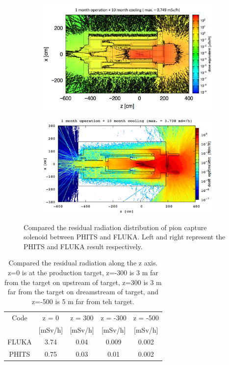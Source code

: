  \begin{figure}[H]
  \begin{subfigure}{0.3\textwidth}
   \centering
   \includegraphics[scale=0.33]{chapter3/fig/phitsdose.pdf}
  \end{subfigure}
  \hspace{0.2\textwidth}
  \begin{subfigure}{0.3\textwidth}
   \centering
   \includegraphics[scale=0.33]{chapter3/fig/flukadose.pdf}
  \end{subfigure}
  \caption{Compared the residual radiation distribution of pion capture solenoid between PHITS and FLUKA. Left and right represent the PHITS and FLUKA result respectively.}
  \label{2dose2}
 \end{figure}
\begin{table}[H]
 \centering
 \begin{tabular}{ccccc} \hline \hline
  Code & z = 0 & z = 300 & z = -300 & z = -500 \\
   & [mSv/h] & [mSv/h] & [mSv/h] & [mSv/h] \\ \hline
  FLUKA & 3.74 & 0.04 & 0.009 & 0.002 \\
  PHITS & 0.75 & 0.03 & 0.01 & 0.002 \\ \hline \hline
 \end{tabular}
 \caption{Compared the residual radiation along the z axis. z=0 is at the production target, z=-300 is 3 m far from the target on upstream of target, z=300 is 3 m far from the target on dreamstream of target, and z=-500 is 5 m far from teh target.}
 \label{dosepo}
\end{table}
